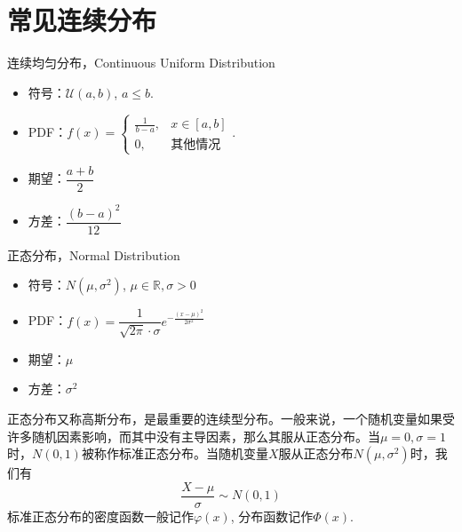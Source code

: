 
\section{常见连续分布}


\begin{frame}

\begin{block}{连续均匀分布，Continuous Uniform Distribution}
\begin{itemize}
\item 符号：$\mathcal{U}(a,b)$, \; $a \le b$.
\item PDF：$f(x) = \begin{cases}
\frac{1}{b-a}, & x\in[a,b] \\
0, & \text{其他情况}
\end{cases}$.
\item 期望：$\dfrac{a+b}{2}$
\item 方差：$\dfrac{(b-a)^2}{12}$
\end{itemize}
\end{block}

\end{frame}


\begin{frame}

\begin{block}{正态分布，Normal Distribution}
\begin{itemize}
\item 符号：$N(\mu, \sigma^2)$, \; $\mu\in\mathbb{R}, \sigma>0$
\item PDF：$f(x) = \dfrac{1}{\sqrt{2\pi}\cdot\sigma} e^{-\frac{(x-\mu)^2}{2\sigma^2}}$
\item 期望：$\mu$
\item 方差：$\sigma^2$
\end{itemize}

\pause

正态分布又称高斯分布，是最重要的连续型分布。一般来说，一个随机变量如果受许多随机因素影响，而其中没有主导因素，那么其服从正态分布。当$\mu = 0, \sigma = 1$时，$N(0, 1)$被称作标准正态分布。当随机变量$X$服从正态分布$N(\mu, \sigma^2)$时，我们有
$$\dfrac{X-\mu}{\sigma} \sim N(0, 1)$$
标准正态分布的密度函数一般记作$\varphi(x)$, 分布函数记作$\Phi(x)$.
\end{block}

\end{frame}

